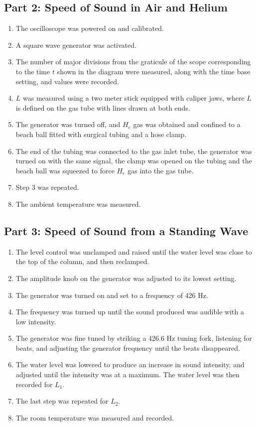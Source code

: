 \documentclass[twocolumn,english]{IEEEtran}
\theoremstyle{plain}
\theoremstyle{plain}
\begin{document}
\subsection*{Part 2: Speed of Sound in Air and Helium}
\begin{enumerate}
 \item The oscilloscope was powered on and calibrated.
 \item A square wave generator was activated.
 \item The number of major divisions from the graticule of the scope corresponding to the time $t$ shown in the diagram were measured, along with the time base setting, and values were recorded.
 \item $L$ was measured using a two meter stick equipped with caliper jaws, where $L$ is defined on the gas tube with lines drawn at both ends.
 \item The generator was turned off, and $H_e$ gas was obtained and confined to  a beach ball fitted with surgical tubing and a hose clamp.
 \item The end of the tubing was connected to the gas inlet tube, the generator was turned on  with the same signal, the clamp was opened on the tubing and the beach ball was squeezed to force $H_e$ gas into the gas tube.
 \item Step 3 was repeated.
 \item The ambient temperature was measured.
\end{enumerate}

\subsection*{Part 3: Speed of Sound from a Standing Wave}
\begin{enumerate}
 \item The level control was unclamped and raised until the water level was close to the top of the column, and then reclamped.
 \item The amplitude knob on the generator was adjusted to its lowest setting.
 \item The generator was turned on and set to a frequency of 426 Hz.
 \item The frequency was turned up until the sound produced was audible with a low intensity.
 \item The generator was fine tuned by striking a 426.6 Hz tuning fork, listening for beats, and adjusting the generator frequency until the beats disappeared.
 \item The water level was lowered to produce an increase in sound intensity, and adjusted until the intensity was at a maximum. The water level was then recorded for $L_1$.
 \item The last step was repeated for $L_2$.
 \item The room temperature was measured and recorded.
\end{enumerate}
\end{document}

